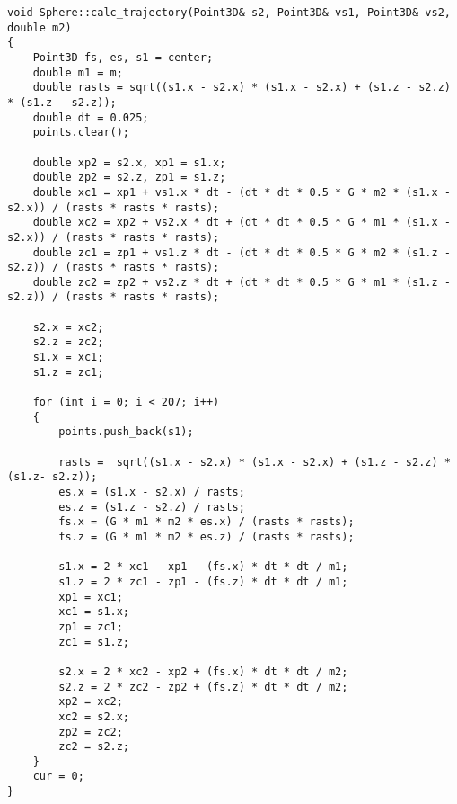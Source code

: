 \begin{center}
\captionsetup{justification=raggedright,singlelinecheck=off}
\begin{lstlisting}[label=lst:orbit,caption=Алгоритм расчета точек орбиты сферы]
void Sphere::calc_trajectory(Point3D& s2, Point3D& vs1, Point3D& vs2, double m2)
{
    Point3D fs, es, s1 = center;
    double m1 = m;
    double rasts = sqrt((s1.x - s2.x) * (s1.x - s2.x) + (s1.z - s2.z) * (s1.z - s2.z));
    double dt = 0.025;
    points.clear();

    double xp2 = s2.x, xp1 = s1.x;
    double zp2 = s2.z, zp1 = s1.z;
    double xc1 = xp1 + vs1.x * dt - (dt * dt * 0.5 * G * m2 * (s1.x - s2.x)) / (rasts * rasts * rasts);
    double xc2 = xp2 + vs2.x * dt + (dt * dt * 0.5 * G * m1 * (s1.x - s2.x)) / (rasts * rasts * rasts);
    double zc1 = zp1 + vs1.z * dt - (dt * dt * 0.5 * G * m2 * (s1.z - s2.z)) / (rasts * rasts * rasts);
    double zc2 = zp2 + vs2.z * dt + (dt * dt * 0.5 * G * m1 * (s1.z - s2.z)) / (rasts * rasts * rasts);

    s2.x = xc2;
    s2.z = zc2;
    s1.x = xc1;
    s1.z = zc1;

    for (int i = 0; i < 207; i++)
    {
        points.push_back(s1);

        rasts =  sqrt((s1.x - s2.x) * (s1.x - s2.x) + (s1.z - s2.z) * (s1.z- s2.z));
        es.x = (s1.x - s2.x) / rasts;
        es.z = (s1.z - s2.z) / rasts;
        fs.x = (G * m1 * m2 * es.x) / (rasts * rasts);
        fs.z = (G * m1 * m2 * es.z) / (rasts * rasts);

        s1.x = 2 * xc1 - xp1 - (fs.x) * dt * dt / m1;
        s1.z = 2 * zc1 - zp1 - (fs.z) * dt * dt / m1;
        xp1 = xc1;
        xc1 = s1.x;
        zp1 = zc1;
        zc1 = s1.z;

        s2.x = 2 * xc2 - xp2 + (fs.x) * dt * dt / m2;
        s2.z = 2 * zc2 - zp2 + (fs.z) * dt * dt / m2;
        xp2 = xc2;
        xc2 = s2.x;
        zp2 = zc2;
        zc2 = s2.z;
    }
    cur = 0;
}
\end{lstlisting}
\end{center}

